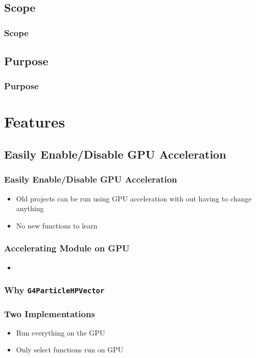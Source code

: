 \documentclass{beamer}
\begin{document}
\subsection{Scope}
\begin{frame}
\frametitle{Scope}
\end{frame}

\subsection{Purpose}
\begin{frame}
\frametitle{Purpose}
\end{frame}


\section{Features}
\subsection{Easily Enable/Disable GPU Acceleration}
\begin{frame}
\frametitle{Easily Enable/Disable GPU Acceleration}
\begin{itemize}
\item Old projects can be run using GPU acceleration with out having to change anything 
\item No new functions to learn
\end{itemize}
\end{frame}

\begin{frame}
\frametitle{Accelerating Module on GPU}
\begin{itemize}
\item
\end{itemize}
\end{frame}

\begin{frame}
\frametitle{Why \texttt{G4ParticleHPVector}}
\end{frame}

\begin{frame}
\frametitle{Two Implementations}
\begin{itemize}
\item Run everything on the GPU
\item Only select functions run on GPU
\end{itemize}
\end{frame}
\end{document}
